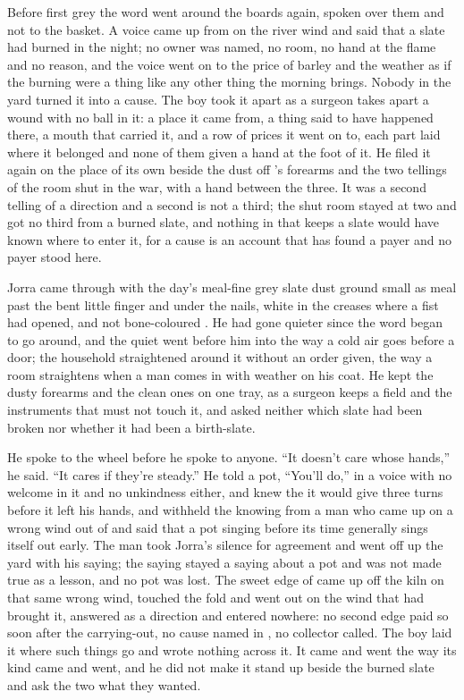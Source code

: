 Before first grey the word went around the boards again, spoken over them and not to the basket. A voice came up from  on the river wind and said that a slate had burned in the night; no owner was named, no room, no hand at the flame and no reason, and the voice went on to the price of barley and the weather as if the burning were a thing like any other thing the morning brings. Nobody in the yard turned it into a cause. The boy took it apart as a surgeon takes apart a wound with no ball in it: a place it came from, a thing said to have happened there, a mouth that carried it, and a row of prices it went on to, each part laid where it belonged and none of them given a hand at the foot of it. He filed it again on the place of its own beside the dust off 's forearms and the two tellings of the room shut in the war, with a hand between the three. It was a second telling of a direction and a second is not a third; the shut room stayed at two and got no third from a burned slate, and nothing in  that keeps a slate would have known where to enter it, for a cause is an account that has found a payer and no payer stood here.

\scenebreak

Jorra came through with the day's meal-fine grey slate dust ground small as meal past the bent little finger and under the nails, white in the creases where a fist had opened, and not bone-coloured . He had gone quieter since the word began to go around, and the quiet went before him into  the way a cold air goes before a door; the household straightened around it without an order given, the way a room straightens when a man comes in with weather on his coat. He kept the dusty forearms and the clean ones on one tray, as a surgeon keeps a field and the instruments that must not touch it, and asked neither which slate had been broken nor whether it had been a birth-slate.

He spoke to the wheel before he spoke to anyone. “It doesn't care whose hands,” he said. “It cares if they're steady.” He told a pot, “You'll do,” in a voice with no welcome in it and no unkindness either, and knew the  it would give three turns before it left his hands, and withheld the knowing from a man who came up on a wrong wind out of  and said that a pot singing before its time generally sings itself out early. The man took Jorra's silence for agreement and went off up the yard with his saying; the saying stayed a saying about a pot and was not made true as a lesson, and no pot was lost. The sweet edge of  came up off the kiln on that same wrong wind, touched the fold and went out on the wind that had brought it, answered as a direction and entered nowhere: no second edge paid so soon after the carrying-out, no cause named in , no collector called. The boy laid it where such things go and wrote nothing across it. It came and went the way its kind came and went, and he did not make it stand up beside the burned slate and ask the two what they wanted.

